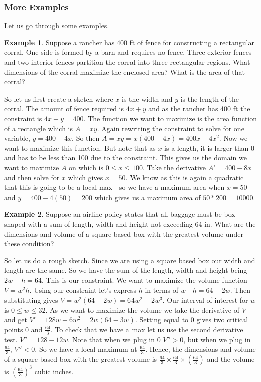\documentclass[12pt,reqno]{article}
\theoremstyle{definition}
\newtheorem*{Example}{Example}
\begin{document}
\subsubsection{More Examples}
	Let us go through some examples. 
	\begin{Example}
		Suppose a rancher has 400 ft of fence for constructing a rectangular corral. One side is formed by a barn and requires no fence. Three exterior fences and two interior fences partition the corral into three rectangular regions. What dimensions of the corral maximize the enclosed area? What is the area of that corral? 
		
		So let us first create a sketch where $x$ is the width and $y$ is the length of the corral. The amount of fence required is $4x + y$ and as the rancher has 400 ft the constraint is $4x + y = 400$. The function we want to maximize is the area function of a rectangle which is $A = xy$. Again rewriting the constraint to solve for one variable, $y = 400 - 4x$. So then $A = xy = x(400 - 4x) = 400x - 4x^2$. Now we want to maximize this function. But note that as $x$ is a length, it is larger than 0 and has to be less than 100 due to the constraint. This gives us the domain we want to maximize $A$ on which is $0 \leq x \leq 100$. Take the derivative $A' = 400 - 8x$ and then solve for $x$ which gives $x = 50$. We know as this is again a quadratic that this is going to be a local max - so we have a maximum area when $x = 50$ and $y = 400 - 4(50) = 200$ which gives us a maximum area of $50*200 = 10000$. 
	\end{Example}
	
	\begin{Example}
		Suppose an airline policy states that all baggage must be box-shaped with a sum of length, width and height not exceeding 64 in. What are the dimensions and volume of a square-based box with the greatest volume under these condition? 
		
		So let us do a rough sketch. Since we are using a square based box our width and length are the same. So we have the sum of the length, width and height being $2w + h = 64$. This is our constraint. We want to maximize the volume function $V = w^2 h$. Using our constraint let's express $h$ in terms of $w$ - $h = 64 - 2w$. Then substituting gives $V = w^2 (64 - 2w) = 64w^2 - 2 w^3$. Our interval of interest for $w$ is $0 \leq w \leq 32$. As we want to maximize the volume we take the derivative of $V$ and get $V' = 128 w - 6w^2 = 2w(64 - 3w)$. Setting equal to 0 gives two critical points 0 and $\frac{64}{3}$. To check that we have a max let us use the second derivative test. $V'' = 128 - 12w$. Note that when we plug in $0$ $V''>0$, but when we plug in $\frac{64}{3}$, $V'' < 0$. So we have a local maximum at $\frac{64}{3}$. Hence, the dimensions and volume of a square-based box with the greatest volume is $\frac{64}{3} \times \frac{64}{3} \times \left(\frac{64}{3}\right)$ and the volume is $\left(\frac{64}{3}\right)^3$ cubic inches.  
	\end{Example}
	
\end{document}

